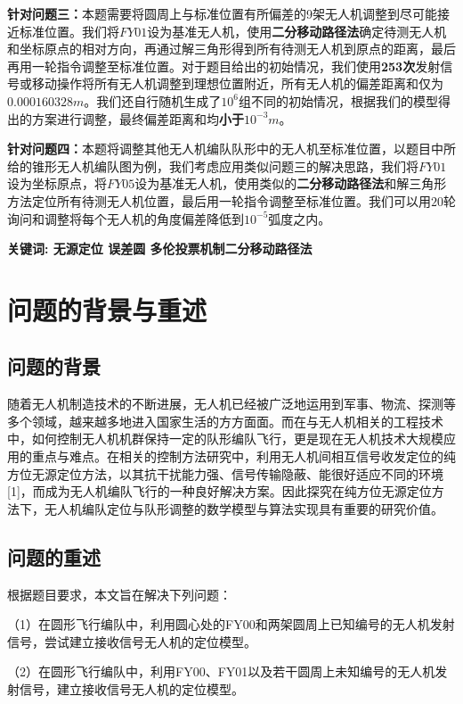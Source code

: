 \documentclass{ctexart}
\begin{document}
\textbf{针对问题三：}\quad 本题需要将圆周上与标准位置有所偏差的9架无人机调整到尽可能接近标准位置。我们将$FY01$设为基准无人机，使用\textbf{二分移动路径法}确定待测无人机和坐标原点的相对方向，再通过解三角形得到所有待测无人机到原点的距离，最后再用一轮指令调整至标准位置。对于题目给出的初始情况，我们使用\textbf{253次}发射信号或移动操作将所有无人机调整到理想位置附近，所有无人机的偏差距离和仅为\textbf{$0.000160328m$}。我们还自行随机生成了$10^6$组不同的初始情况，根据我们的模型得出的方案进行调整，最终偏差距离和均\textbf{小于$10^{-3}m$}。

\textbf{针对问题四：}\quad 本题将调整其他无人机编队队形中的无人机至标准位置，以题目中所给的锥形无人机编队图为例，我们考虑应用类似问题三的解决思路，我们将$FY01$设为坐标原点，将$FY05$设为基准无人机，使用类似的\textbf{二分移动路径法}和解三角形方法定位所有待测无人机位置，最后用一轮指令调整至标准位置。我们可以用$20$轮询问和调整将每个无人机的角度偏差降低到$10^{-5}$弧度之内。


\quad

\textbf{关键词: \quad 无源定位 \quad 误差圆 \quad 多伦投票机制\quad 二分移动路径法 }

\newpage
\section{问题的背景与重述}
\subsection{问题的背景}
随着无人机制造技术的不断进展，无人机已经被广泛地运用到军事、物流、探测等多个领域，越来越多地进入国家生活的方方面面。而在与无人机相关的工程技术中，如何控制无人机机群保持一定的队形编队飞行，更是现在无人机技术大规模应用的重点与难点。在相关的控制方法研究中，利用无人机间相互信号收发定位的纯方位无源定位方法，以其抗干扰能力强、信号传输隐蔽、能很好适应不同的环境[1]，而成为无人机编队飞行的一种良好解决方案。因此探究在纯方位无源定位方法下，无人机编队定位与队形调整的数学模型与算法实现具有重要的研究价值。

\subsection{问题的重述}
根据题目要求，本文旨在解决下列问题：

（1）在圆形飞行编队中，利用圆心处的FY00和两架圆周上已知编号的无人机发射信号，尝试建立接收信号无人机的定位模型。

（2）在圆形飞行编队中，利用FY00、FY01以及若干圆周上未知编号的无人机发射信号，建立接收信号无人机的定位模型。
\end{document}
